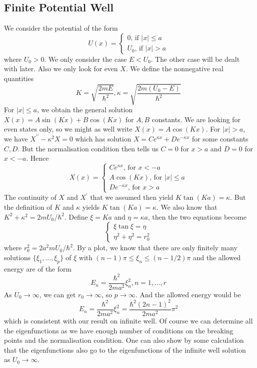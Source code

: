 \subsection{Finite Potential Well}
We consider the potential of the form
$$U(x)=\begin{cases}
    0\text{, if $|x|\le a$}\\
    U_0\text{, if $|x|>a$}
\end{cases}$$
where $U_0>0$.
We only consider the case $E<U_0$.
The other case will be dealt with later.
Also we only look for even $X$.
We define the nonnegative real quantities
$$K=\sqrt{\frac{2mE}{\hbar^2}},\kappa=\sqrt{\frac{2m(U_0-E)}{\hbar^2}}$$
For $|x|\le a$, we obtain the general solution $X(x)=A\sin(Kx)+B\cos(Kx)$ for $A,B$ constants.
We are looking for even states only, so we might as well write $X(x)=A\cos(Kx)$.
For $|x|>a$, we have $X^{\prime\prime}-\kappa^2X=0$ which has solution $X=Ce^{\kappa x}+De^{-\kappa x}$ for some constants $C,D$.
But the normalisation condition then tells us $C=0$ for $x>a$ and $D=0$ for $x<-a$.
Hence
$$X(x)=\begin{cases}
    Ce^{\kappa x}\text{, for $x<-a$}\\
    A\cos(Kx)\text{, for $|x|\le a$}\\
    De^{-\kappa x}\text{, for $x>a$}
\end{cases}$$
The continuity of $X$ and $X^\prime$ that we assumed then yield $K\tan(Ka)=\kappa$.
But the definition of $K$ and $\kappa$ yields $K\tan(Ka)=\kappa$.
We also know that $K^2+\kappa^2=2mU_0/\hbar^2$.
Define $\xi=Ka$ and $\eta=\kappa a$, then the two equations become
$$\begin{cases}
    \xi\tan\xi=\eta\\
    \eta^2+\eta^2=r_0^2
\end{cases}$$
where $r_0^2=2a^2mU_0/\hbar^2$.
By a plot, we know that there are only finitely many solutions $\{\xi_1,\ldots,\xi_p\}$ of $\xi$ with $(n-1)\pi\le\xi_n\le(n-1/2)\pi$ and the allowed energy are of the form
$$E_n=\frac{\hbar^2}{2ma^2}\xi_n^2,n=1,\ldots,r$$
As $U_0\to\infty$, we can get $r_0\to\infty$, so $p\to\infty$.
And the allowed energy would be
$$E_n=\frac{\hbar^2}{2ma^2}\xi_n^2=\frac{\hbar^2(2n-1)^2}{2ma^2}\pi^2$$
which is consistent with our result on infinite well.
Of course we can determine all the eigenfunctions as we have enough number of conditions on the breaking points and the normalisation condition.
One can also show by some calculation that the eigenfunctions also go to the eigenfunctions of the infinite well solution as $U_0\to\infty$.
